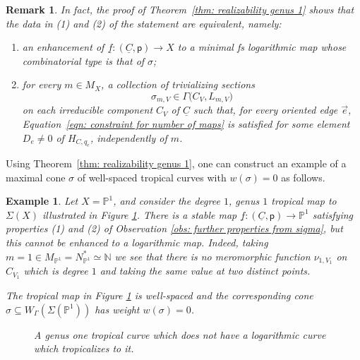 \documentclass{article}
\def\N{{\mathbb{N}}}
\def\P{\mathbb{P}}
\newtheorem{example}[definition]{Example}
\newtheorem{remark}[definition]{Remark}
\begin{document}
\begin{remark} \label{rmk: stronger_version_realizability}
In fact, the proof of Theorem~\ref{thm: realizability genus 1} shows that the data in \textup{(1)} and \textup{(2)} of the statement are equivalent, namely:
\begin{enumerate}[label=(\arabic*)]
    \item an enhancement of $\underline{f} \colon (\underline{C},\mathsf{p}) \to X$ to a minimal fs logarithmic map whose combinatorial type is that of $\sigma$;
    \item for every $m \in M_X$, a collection of trivializing sections
    \[
    \sigma_{m,V} \in \Gamma\bigl(C_V, L_{m,V}\bigr)
    \]
    on each irreducible component $C_V$ of $\underline{C}$ such that, for every oriented edge $\vec{e}$, Equation~\eqref{eqn: constraint for number of maps} is satisfied for some element $D_e \neq 0$ of $H_{C,q_e}$, independently of $m$.
\end{enumerate}
\end{remark}

Using Theorem~\ref{thm: realizability genus 1}, one can construct an example of a  maximal cone $\sigma$ of well-spaced tropical curves with $w(\sigma)=0$ as follows.


\begin{example}\label{example: weight zero example}
    Let $X = \mathbb{P}^1$, and consider the degree $1$, genus $1$ tropical map to $\Sigma(X)$ illustrated in Figure \ref{fig:nonrealizable}. There is a stable map $\underline{f}:(\underline{C}, \mathsf{p}) \rightarrow \mathbb{P}^1$ satisfying properties (1) and (2) of Observation \ref{obs: further properties from sigma}, but this cannot be enhanced to a logarithmic map. Indeed, taking $m=1 \in M_{\P^1}=N_{\P^1}^* \simeq \N$ we see that there is no meromorphic function $\nu_{1,V_1}$ on $C_{V_1}$ which is degree $1$ and taking the same value at two distinct points. 
    
    The tropical map in Figure \ref{fig:nonrealizable} is well-spaced and the corresponding cone $\sigma \subseteq W_{\Gamma}(\Sigma(\P^1))$ has weight $w(\sigma)=0$.
    
    \begin{figure}[h]
        \centering
        \caption{A genus one tropical curve which does not have a logarithmic curve which tropicalizes to it.}
        \label{fig:nonrealizable}
    \end{figure}

    
\end{example}
\end{document}
